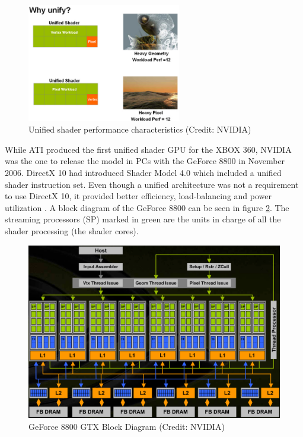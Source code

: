 \begin{figure}[ht]
    \centering
    \includegraphics[width=0.6\textwidth]{img/unified-shader-gpu-utilization.png}
    \captionsetup{justification=centering}
    \caption{Unified shader performance characteristics (Credit: NVIDIA)}
    \label{fig:gpu-unified-shader-perf}
\end{figure}

While ATI produced the first unified shader GPU for the XBOX 360, NVIDIA was the one  to release the model in PCs with the GeForce 8800 in November 2006. DirectX 10 had introduced Shader Model 4.0 which included a unified shader instruction set. Even though a unified architecture was not a requirement to use DirectX 10, it provided better efficiency, load-balancing and power utilization \cite{geforce_8800_architecture}. A block diagram of the GeForce 8800 can be seen in figure \ref{fig:8800-arch}. The streaming processors (SP) marked in green are the units in charge of all the shader processing (the shader cores).

\begin{figure}[ht]
    \centering
    \includegraphics[width=\textwidth]{img/geforce-8800-block-diagram.png}
    \captionsetup{justification=centering}
    \caption{GeForce 8800 GTX Block Diagram (Credit: NVIDIA)}
    \label{fig:8800-arch}
\end{figure}

